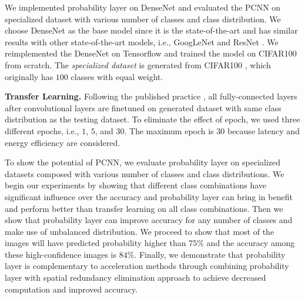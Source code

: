 \documentclass{article}
\begin{document}
We implemented probability layer on DenseNet \cite{huang2017densely} and evaluated the PCNN on specialized dataset with various number of classes and class distribution. We choose DenseNet as the base model since it is the state-of-the-art and has similar results with other state-of-the-art models, i.e., GoogLeNet \cite{szegedy2015going} and ResNet \cite{he2016deep}. We reimplemented the DenseNet on Tensorflow \cite{abadi2016tensorflow} and trained the model on CIFAR100 \cite{krizhevsky2009learning} from scratch. The \textit{specialized dataset} is generated from CIFAR100 \cite{krizhevsky2009learning}, which originally has $100$ classes with equal weight. 

\textbf{Transfer Learning.} Following the published practice \cite{doersch2015unsupervised, han2016mcdnn, oquab2014learning, shen2017fast, yosinski2014transferable}, all fully-connected layers after convolutional layers are finetuned on generated dataset with same class distribution as the testing dataset. To eliminate the effect of epoch, we used three different epochs, i.e., $1$, $5$, and $30$. The maximum epoch is $30$ because latency and energy efficiency are considered.

To show the potential of PCNN, we evaluate probability layer on specialized datasets composed with various number of classes and class distributions. We begin our experiments by showing that different class combinations have significant influence over the accuracy and probability layer can bring in benefit and perform better than transfer learning on all class combinations. Then we show that probability layer can improve accuracy for any number of classes and make use of unbalanced distribution. We proceed to show that most of the images will have predicted probability higher than $75\%$ and the accuracy among these high-confidence images is $84\%$. Finally, we demonstrate that probability layer is complementary to acceleration methods through combining probability layer with spatial redundancy elimination approach \cite{figurnov2016perforatedcnns} to achieve decreased computation and improved accuracy.
\end{document}
